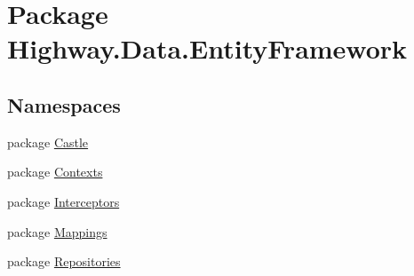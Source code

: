 \hypertarget{namespace_highway_1_1_data_1_1_entity_framework}{\section{Package Highway.\-Data.\-Entity\-Framework}
\label{namespace_highway_1_1_data_1_1_entity_framework}
}
\subsection*{Namespaces}
\begin{DoxyCompactItemize}
\item 
package \hyperlink{namespace_highway_1_1_data_1_1_entity_framework_1_1_castle}{Castle}
\item 
package \hyperlink{namespace_highway_1_1_data_1_1_entity_framework_1_1_contexts}{Contexts}
\item 
package \hyperlink{namespace_highway_1_1_data_1_1_entity_framework_1_1_interceptors}{Interceptors}
\item 
package \hyperlink{namespace_highway_1_1_data_1_1_entity_framework_1_1_mappings}{Mappings}
\item 
package \hyperlink{namespace_highway_1_1_data_1_1_entity_framework_1_1_repositories}{Repositories}
\end{DoxyCompactItemize}
